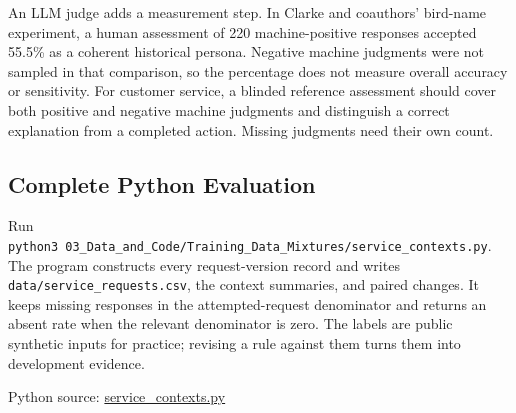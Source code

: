 An LLM judge adds a measurement step. In Clarke and coauthors' bird-name
experiment, a human assessment of 220 machine-positive responses
accepted 55.5\% as a coherent historical persona. Negative machine
judgments were not sampled in that comparison, so the percentage does
not measure overall accuracy or sensitivity. For customer service, a
blinded reference assessment should cover both positive and negative
machine judgments and distinguish a correct explanation from a completed
action. Missing judgments need their own count.

\hypertarget{M07-complete-python-evaluation-1}{%
\subsection{Complete Python
Evaluation}\label{M07-complete-python-evaluation-1}}

\noindent \noindent Run
\texttt{python3\ 03\_Data\_and\_Code/Training\_Data\_Mixtures/service\_contexts.py}.
The program constructs every request-version record and writes
\texttt{data/service\_requests.csv}, the context summaries, and paired
changes. It keeps missing responses in the attempted-request denominator
and returns an absent rate when the relevant denominator is zero. The
labels are public synthetic inputs for practice; revising a rule against
them turns them into development evidence.

\FloatBarrier
{}
Python source:
\href{../03_Data_and_Code/Training_Data_Mixtures/service_contexts.py}{service\_contexts.py}

